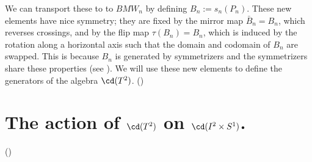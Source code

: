 We can transport these to to $BMW_n$ by defining $B_n := s_n(P_n)$. 
These new elements have nice symmetry; they are fixed by the mirror map $\bar{B}_n = B_n$, which reverses crossings, and by the flip map $\tau(B_n) = B_n$, which is induced by the rotation along a horizontal axis such that the domain and codomain of $B_n$ are swapped. 
This is because $B_n$ is generated by symmetrizers and the symmetrizers share these properties (see \cite{She16}). 
We will use these new elements to define the generators of the algebra $\cd(T^2)$. 
()

\section{\textbf{The action of $\cd(T^2)$ on $\cd(I^2 \times S^1)$.}} \label{sec:action}
()

